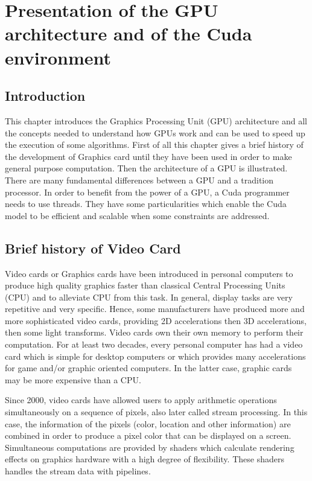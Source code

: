 

\chapter{Presentation of the GPU architecture and of the Cuda environment}
\label{chapter1}

\section{Introduction}\label{ch1:intro}

This chapter introduces the Graphics  Processing Unit (GPU) architecture and all
the concepts needed to understand how GPUs  work and can be used to speed up the
execution of some algorithms. First of all this chapter gives a brief history of
the development  of Graphics  card until they  have been  used in order  to make
general   purpose   computation.    Then   the   architecture  of   a   GPU   is
illustrated.  There  are  many  fundamental  differences between  a  GPU  and  a
tradition  processor. In  order  to benefit  from the  power  of a  GPU, a  Cuda
programmer needs to use threads. They have some particularities which enable the
Cuda model to be efficient and scalable when some constraints are addressed.



\section{Brief history of Video Card}

Video  cards or Graphics  cards have  been introduced  in personal  computers to
produce  high quality graphics  faster than  classical Central  Processing Units
(CPU) and  to alleviate CPU from this  task. In general, display  tasks are very
repetitive and very specific.  Hence,  some manufacturers have produced more and
more sophisticated video cards, providing 2D accelerations then 3D accelerations,
then some  light transforms. Video cards  own their own memory  to perform their
computation.  For at least two decades, every personal computer has had a video
card which is simple for  desktop computers or which provides many accelerations
for game and/or  graphic oriented computers.  In the  latter case, graphic cards
may be more expensive than a CPU.

Since  2000, video  cards have  allowed  users to  apply arithmetic  operations
simultaneously on a sequence of  pixels, also later called stream processing. In
this case, the information of the pixels (color, location and other information) are
combined in order  to produce a pixel  color that can be displayed  on a screen.
Simultaneous  computations are  provided  by shaders  which calculate  rendering
effects on  graphics hardware with a  high degree of  flexibility. These shaders
handles the stream data with pipelines.


